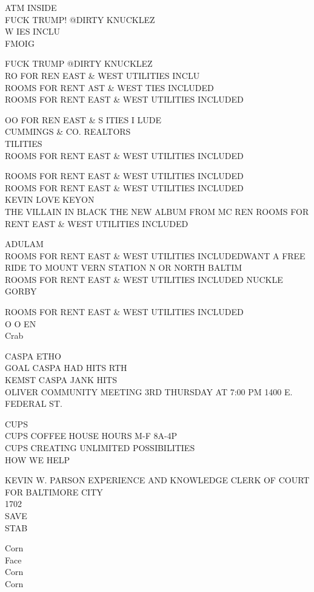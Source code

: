 \documentclass[10pt,letterpaper]{article}
\begin{document}
ATM INSIDE\\
FUCK TRUMP!  @DIRTY KNUCKLEZ\\
W IES INCLU\\
FMOIG

FUCK TRUMP @DIRTY KNUCKLEZ\\
RO FOR REN EAST \& WEST UTILITIES INCLU\\
ROOMS FOR RENT AST \& WEST TIES INCLUDED\\
ROOMS FOR RENT EAST \& WEST UTILITIES INCLUDED

OO FOR REN EAST \& S ITIES I LUDE\\
CUMMINGS \& CO. REALTORS\\
TILITIES\\
ROOMS FOR RENT EAST \& WEST UTILITIES INCLUDED

ROOMS FOR RENT EAST \& WEST UTILITIES INCLUDED\\
ROOMS FOR RENT EAST \& WEST UTILITIES INCLUDED\\
KEVIN LOVE KEYON\\
THE VILLAIN IN BLACK THE NEW ALBUM FROM MC REN ROOMS FOR RENT EAST \& WEST UTILITIES INCLUDED

ADULAM\\
ROOMS FOR RENT EAST \& WEST UTILITIES INCLUDEDWANT A FREE RIDE TO MOUNT VERN STATION N OR NORTH BALTIM\\
ROOMS FOR RENT EAST \& WEST UTILITIES INCLUDED NUCKLE\\
GORBY

ROOMS FOR RENT EAST \& WEST UTILITIES INCLUDED\\
O O EN\\
Crab

CASPA ETHO\\
GOAL CASPA HAD HITS RTH\\
KEMST CASPA JANK HITS\\
OLIVER COMMUNITY MEETING 3RD THURSDAY AT 7:00 PM 1400 E. FEDERAL ST.

CUPS\\
CUPS COFFEE HOUSE HOURS M{-}F 8A{-}4P\\
CUPS CREATING UNLIMITED POSSIBILITIES\\
HOW WE HELP

KEVIN W. PARSON EXPERIENCE AND KNOWLEDGE CLERK OF COURT FOR BALTIMORE CITY\\
1702\\
SAVE\\
STAB

Corn\\
Face\\
Corn\\
Corn
\end{document}
